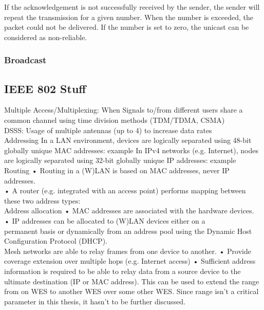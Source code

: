\documentclass[]{ccs-thesis}
\begin{document}
If the acknowledgement is not successfully received by the sender, the sender will repeat the transmission for a given number.
When the number is exceeded, the packet could not be delivered. 
If the number is set to zero, the unicast can be considered as non-reliable.

\subsubsection{Broadcast}




\subsection{IEEE 802 Stuff}
Multiple Access/Multiplexing: When Signals to/from different users share a common channel using time division methods (TDM/TDMA, CSMA)\\

DSSS: Usage of multiple antennas
(up to 4) to increase data rates\\

Addressing
In a LAN environment, devices are logically separated using 48-bit
globally unique MAC addresses: example
In IPv4 networks (e.g. Internet), nodes are logically separated
using 32-bit globally unique IP addresses: example \\

Routing
• Routing in a (W)LAN is based on MAC addresses, never IP addresses.\\
• A router (e.g. integrated with an access point) performs mapping between\\
these two address types: \\

Address allocation
• MAC addresses are associated with the hardware devices.\\
• IP addresses can be allocated to (W)LAN devices either on a\\
permanent basis or dynamically from an address pool using the
Dynamic Host Configuration Protocol (DHCP). \\

Mesh networks
are able to relay frames from one device to another.
• Provide coverage extension over multiple hops (e.g. Internet access)
• Sufficient address information is required to be able to relay data from a
source device to the ultimate destination (IP or MAC address).
This can be used to extend the range from on \ac{WES} to another \ac{WES} over some other \ac{WES}.
Since range isn't a critical parameter in this thesis, it hasn't to be further discussed.\\
\end{document}
